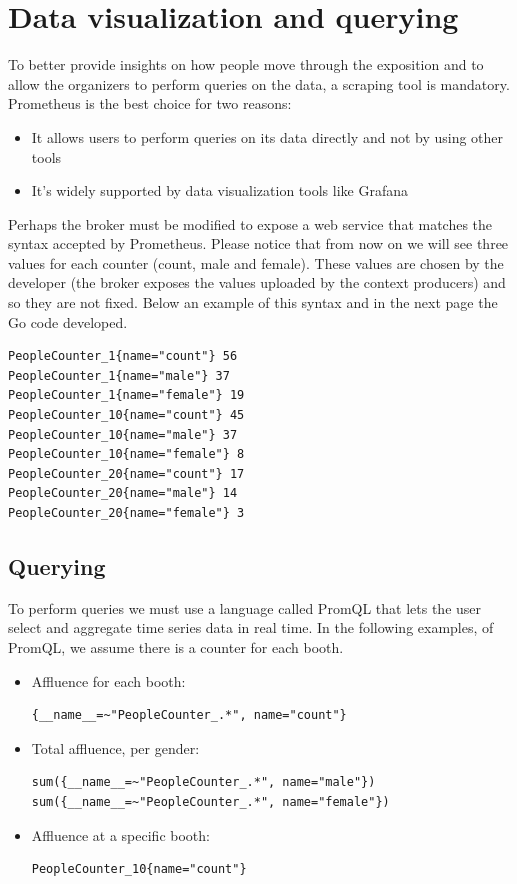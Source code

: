 \documentclass[conference]{ieeeconf}
\begin{document}
\section{Data visualization and querying}
To better provide insights on how people move through the exposition and to allow the organizers to perform queries on the data, a scraping tool is mandatory.
Prometheus is the best choice for two reasons:
\begin{itemize}
    \item It allows users to perform queries on its data directly and not by using other tools
    \item It's widely supported by data visualization tools like Grafana
\end{itemize}{}
Perhaps the broker must be modified to expose a web service that matches the syntax accepted by Prometheus.
Please notice that from now on we will see three values for each counter (count, male and female). These values are chosen by the developer (the broker exposes the values uploaded by the context producers) and so they are not fixed.
Below an example of this syntax and in the next page the Go code developed.
\begin{lstlisting}
PeopleCounter_1{name="count"} 56
PeopleCounter_1{name="male"} 37
PeopleCounter_1{name="female"} 19
PeopleCounter_10{name="count"} 45
PeopleCounter_10{name="male"} 37
PeopleCounter_10{name="female"} 8
PeopleCounter_20{name="count"} 17
PeopleCounter_20{name="male"} 14
PeopleCounter_20{name="female"} 3
\end{lstlisting}{}

\subsection{Querying}
To perform queries we must use a language called PromQL that lets the user select and aggregate time series data in real time.
In the following examples, of PromQL, we assume there is a counter for each booth.
\begin{itemize}
    \item Affluence for each booth:
    \begin{lstlisting}[breaklines=true]
{__name__=~"PeopleCounter_.*", name="count"}
    \end{lstlisting}{}
    \item Total affluence, per gender:
    \begin{lstlisting}[breaklines=true]
sum({__name__=~"PeopleCounter_.*", name="male"})
sum({__name__=~"PeopleCounter_.*", name="female"})
    \end{lstlisting}{}
    \item Affluence at a specific booth:
    \begin{lstlisting}[breaklines=true]
PeopleCounter_10{name="count"}
    \end{lstlisting}{}
\end{itemize}{}
\end{document}
